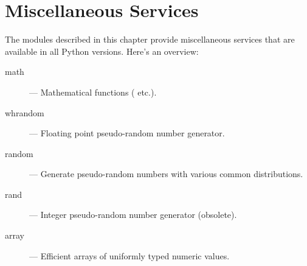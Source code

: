 \chapter{Miscellaneous Services}

The modules described in this chapter provide miscellaneous services
that are available in all Python versions.  Here's an overview:

\begin{description}

\item[math]
--- Mathematical functions ( etc.).

\item[whrandom]
--- Floating point pseudo-random number generator.

\item[random]
--- Generate pseudo-random numbers with various common distributions.

\item[rand]
--- Integer pseudo-random number generator (obsolete).

\item[array]
--- Efficient arrays of uniformly typed numeric values.

\end{description}
